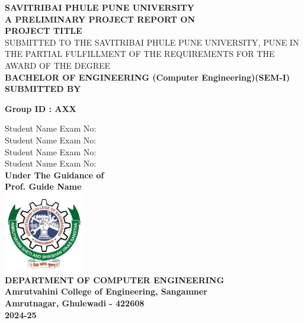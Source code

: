 \documentclass[oneside,a4paper,12pt]{report}
\begin{document}
\setlength{\parindent}{0mm}
\begin{center}
{\bfseries SAVITRIBAI PHULE PUNE UNIVERSITY \\}
 \vspace*{1\baselineskip}
{\bfseries A PRELIMINARY PROJECT REPORT ON \\}
 \vspace*{1\baselineskip}
{\bfseries \fontsize{16}{12} \selectfont PROJECT TITLE \\ \vspace*{2\baselineskip}}
{\fontsize{12}{12} \selectfont SUBMITTED TO THE SAVITRIBAI PHULE PUNE UNIVERSITY, PUNE
IN THE PARTIAL FULFILLMENT OF THE REQUIREMENTS 
FOR THE AWARD OF THE DEGREE \\
\vspace*{2\baselineskip}}
{\bfseries \fontsize{14}{12} \selectfont 
\hspace{18 mm}BACHELOR OF ENGINEERING
\newline(Computer Engineering)(SEM-I) \\
\vspace*{1\baselineskip}} 
{\bfseries \fontsize{14}{12} \selectfont SUBMITTED BY \\ 
} 
\begin{center}
\bf{Group ID : AXX}
\end{center}
Student Name  \hspace{25 mm} Exam No:  \\
Student Name \hspace{25 mm} Exam No:   \\
Student Name \hspace{25 mm} Exam No:  \\
Student Name \hspace{25 mm} Exam No:\\
\vspace*{1\baselineskip}
{\bfseries \fontsize{14}{12} \selectfont Under The Guidance of \\  
\vspace*{1\baselineskip}} 
\bf{Prof. Guide Name}\\
\includegraphics[width=100pt]{AVCOE_LOGO.png} \\
{\bfseries \fontsize{14}{12} \selectfont DEPARTMENT OF COMPUTER ENGINEERING \\
Amrutvahini College of Engineering, Sangamner\\
Amrutnagar, Ghulewadi - 422608 \\
2024-25
}
\end{center}
\end{document}
